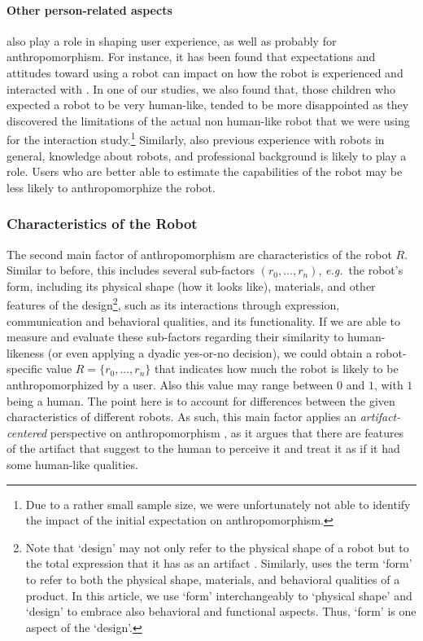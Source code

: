 \documentclass{frontiersSCNS} %
\newcommand{\eg}{{\textit{e.g.~}}}
\begin{document}
\paragraph{Other person-related aspects} also play a role in shaping user experience, as well as probably for anthropomorphism. For instance, it has been found that expectations and attitudes toward using a robot can impact on how the robot is experienced and interacted with \citep{forlizzi_service_2006,forlizzi_how_2007}. In one of our studies, we also found that, those children who expected a robot to be very human-like, tended to be more disappointed as they discovered the limitations of the actual non human-like robot that we were using for the interaction study.\footnote{Due to a rather small sample size, we were unfortunately not able to identify the impact of the initial expectation on anthropomorphism.} Similarly, also previous experience with robots in general, knowledge about robots, and professional background is likely to play a role. Users who are better able to estimate the capabilities of the robot may be less likely to anthropomorphize the robot.


\subsubsection{Characteristics of the Robot\\}
\label{sec:factor-robot}

The second main factor of anthropomorphism are characteristics of the robot $R$. Similar to before, this includes several sub-factors $(r_0, ... , r_n)$, \eg the robot's form, including its physical shape (how it looks like), materials, and other features of the design\footnote{Note that `design' may not only refer to the physical shape of a robot but to the total expression that it has as an artifact \citep{bartneck_shaping_2004}. Similarly, \cite{disalvo_hug:_2003} uses the term `form' to refer to both the physical shape, materials, and behavioral qualities of a product. In this article, we use `form' interchangeably to `physical shape' and `design' to embrace also behavioral and functional aspects. Thus, `form' is one aspect of the `design'.}, such as its interactions through expression, communication and behavioral qualities, and its functionality. If we are able to measure and evaluate these sub-factors regarding their similarity to human-likeness (or even applying a dyadic yes-or-no decision), we could obtain a robot-specific value $R=\{r_0, ... , r_n\}$ that indicates how much the robot is likely to be anthropomorphized by a user. Also this value may range between $0$ and $1$, with $1$ being a human. The point here is to account for differences between the given characteristics of different robots. As such, this main factor applies an \textit{artifact-centered} perspective on anthropomorphism
, as it argues that there are features of the artifact that suggest to the human to perceive it and treat it as if it had some human-like qualities.
\end{document}
